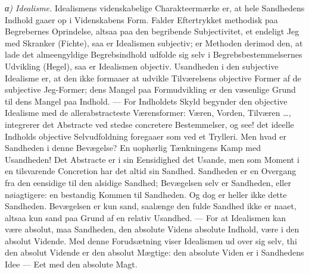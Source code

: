 \documentclass[12pt]{book}
\newcommand{\apage}[1]{\marginnote{\footnotesize\textit{[#1]}}}
\begin{document}
\emph{α) Idealisme.} Idealismens videnskabelige Charakteermærke er, at hele
Sandhedens Indhold gaaer op i Videnskabens Form. Falder Eftertrykket
methodisk paa Begrebernes Oprindelse, altsaa paa den begribende
Subjectivitet, et endeligt Jeg med Skranker (Fichte), saa er Idealismen
subjectiv; er Methoden derimod den, at lade det almeengyldige
Begrebsindhold udfolde sig selv i Begrebsbestemmelsernes Udvikling (Hegel),
saa er Idealismen objectiv. Usandheden i den subjective Idealisme er, at
den ikke formaaer at udvikle Tilværelsens objective Former af de subjective
Jeg-Former; dens Mangel paa Formudvikling er den væsenlige Grund \apage{114} til dens
Mangel paa Indhold. --- For Indholdets Skyld begynder den objective
Idealisme med de allerabstracteste Værensformer: Væren, Vorden, Tilværen
\ldots, integrerer det Abstracte ved stedse concretere Bestemmelser, og
see! det ideelle Indholds objective Selvudfoldning foregaaer som ved et
Trylleri. Men hvad er Sandheden i denne Bevægelse? En uophørlig Tænkningens
Kamp med Usandheden! Det Abstracte er i sin Eensidighed det Usande, men som
Moment i en tilsvarende Concretion har det altid sin Sandhed. Sandheden er
en Overgang fra den eensidige til den alsidige Sandhed; Bevægelsen selv er
Sandheden, eller nøiagtigere: en bestandig Kommen til Sandheden. Og dog er
heller ikke dette Sandheden. Bevægelsen er kun sand, saalænge den fulde
Sandhed ikke er naaet, altsaa kun sand paa Grund af en relativ Usandhed.
--- For at Idealismen kan være absolut, maa Sandheden, den absolute Videns
absolute Indhold, være i den absolut Vidende. Med denne Forudsætning viser
Idealismen ud over sig selv, thi den absolut Vidende er den absolut
Mægtige: den absolute Viden er i Sandhedens Idee --- Eet med den absolute Magt.
\end{document}
